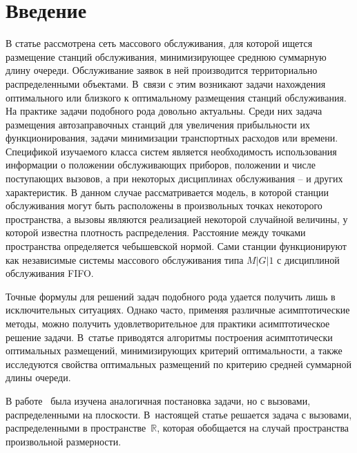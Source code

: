 

      \thispagestyle{headings}

      \begin{multicols}{2}

      \label{st\stat}

\section{Введение}

В статье рассмотрена сеть массового обслуживания, для которой ищется размещение станций обслуживания, 
минимизирующее среднюю суммарную длину очереди. Обслуживание заявок в ней производится территориально 
распределенными объектами. В~связи с этим возникают задачи нахождения оптимального или близкого к 
оптимальному размещения станций обслуживания. На практике задачи подобного рода довольно актуальны. 
Среди них задача размещения автозаправочных станций для увеличения прибыльности их функционирования, 
задачи минимизации транспортных расходов или времени. Спецификой изучаемого класса систем является 
необходимость использования информации о положении обслуживающих приборов, положении и числе поступающих 
вызовов, а при некоторых дисциплинах обслуживания -- и других характеристик. В данном случае рассматривается 
модель, в которой станции обслуживания могут быть расположены в произвольных точках некоторого пространства, 
а вызовы являются реализацией некоторой случайной величины, у которой известна плотность распределения. 
Расстояние между точками пространства определяется чебышевской нормой. Сами станции функционируют как 
независимые системы массового обслуживания типа $M|G|1$ с дисциплиной обслуживания FIFO.

Точные формулы для решений задач подобного рода удается получить лишь в исключительных ситуациях. 
Однако часто, применяя различные асимптотические методы, можно получить удовлетворительное для практики 
асимптотическое решение задачи. В~статье приводятся алгоритмы построения асимптотически оптимальных размещений, 
минимизирующих критерий оптимальности, а также исследуются свойства оптимальных размещений по критерию средней 
суммарной длины очереди.

В работе~\cite{3mat} была изучена аналогичная постановка задачи, но с вызовами, распределенными на плоскости. 
В~настоящей статье решается задача с вызовами, распределенными в пространстве~$\mathbb{R}$, 
которая обобщается на случай пространства произвольной размерности.


\end{multicols}
